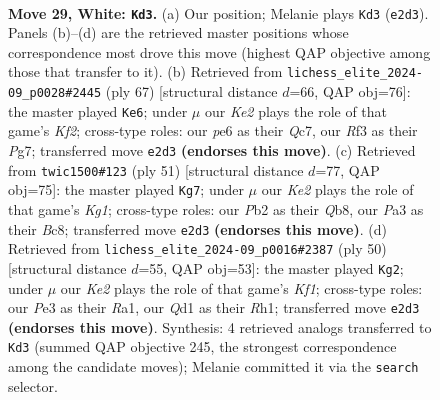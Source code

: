 \documentclass[11pt]{article}
\begin{document}
\clearpage

\begin{figure}[p]\centering
\begin{subfigure}{0.46\textwidth}\centering
\resizebox{\linewidth}{!}{%
\newchessgame
\chessboard[
  setfen={r6r/3nk2p/1pp1p1p1/8/1p1P3P/P3PRb1/RP2K1q1/2BQ4 w - - 0 29},
  showmover=false,
  pgfstyle=straightmove, color=movearrow, markmove={e2-d3}
]}
\caption{}
\end{subfigure}\hfill
\begin{subfigure}{0.46\textwidth}\centering
\resizebox{\linewidth}{!}{%
\newchessgame
\chessboard[
  setfen={3r4/2q2kpQ/1p3r1p/p1b1p2B/5P1P/4p1PK/PP6/5R1R b - - 3 34},
  showmover=false,
  pgfstyle=straightmove, color=movearrow, markmove={f7-e6}
]}
\caption{}
\end{subfigure}
\\[4pt]
\begin{subfigure}{0.46\textwidth}\centering
\resizebox{\linewidth}{!}{%
\newchessgame
\chessboard[
  setfen={1qb1Q1k1/r4p1p/p5p1/P1p5/2p5/2P4P/3r1PP1/R3RBK1 b - - 0 26},
  showmover=false,
  pgfstyle=straightmove, color=movearrow, markmove={g8-g7}
]}
\caption{}
\end{subfigure}\hfill
\begin{subfigure}{0.46\textwidth}\centering
\resizebox{\linewidth}{!}{%
\newchessgame
\chessboard[
  setfen={r6r/p4k2/q1pbp1p1/8/3Pp2P/1p2P2Q/P4P2/R3BK1R w - - 0 26},
  showmover=false,
  pgfstyle=straightmove, color=movearrow, markmove={f1-g2}
]}
\caption{}
\end{subfigure}
\caption{\textbf{Move 29, White: \texttt{Kd3}.} (a) Our position; Melanie plays \texttt{Kd3} (\texttt{e2d3}). Panels (b)--(d) are the retrieved master positions whose correspondence most drove this move (highest QAP objective among those that transfer to it). (b) Retrieved from \texttt{lichess\_elite\_2024-09\_p0028\#2445} (ply 67) [structural distance $d$=66, QAP obj=76]: the master played \texttt{Ke6}; under $\mu$ our \emph{Ke2} plays the role of that game's \emph{Kf2}; cross-type roles: our \emph{p}e6 as their \emph{Q}c7, our \emph{R}f3 as their \emph{P}g7; transferred move \texttt{e2d3} \textbf{(endorses this move)}. (c) Retrieved from \texttt{twic1500\#123} (ply 51) [structural distance $d$=77, QAP obj=75]: the master played \texttt{Kg7}; under $\mu$ our \emph{Ke2} plays the role of that game's \emph{Kg1}; cross-type roles: our \emph{P}b2 as their \emph{Q}b8, our \emph{P}a3 as their \emph{B}c8; transferred move \texttt{e2d3} \textbf{(endorses this move)}. (d) Retrieved from \texttt{lichess\_elite\_2024-09\_p0016\#2387} (ply 50) [structural distance $d$=55, QAP obj=53]: the master played \texttt{Kg2}; under $\mu$ our \emph{Ke2} plays the role of that game's \emph{Kf1}; cross-type roles: our \emph{P}e3 as their \emph{R}a1, our \emph{Q}d1 as their \emph{R}h1; transferred move \texttt{e2d3} \textbf{(endorses this move)}. Synthesis: 4 retrieved analogs transferred to \texttt{Kd3} (summed QAP objective 245, the strongest correspondence among the candidate moves); Melanie committed it via the \texttt{search} selector.}
\label{fig:thought-m56}
\end{figure}
\end{document}

